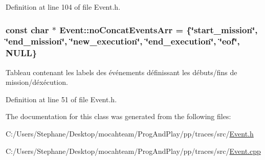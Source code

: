 Definition at line 104 of file Event.\+h.

\subsubsection[{\texorpdfstring{no\+Concat\+Events\+Arr}{noConcatEventsArr}}]{\setlength{\rightskip}{0pt plus 5cm}const char $\ast$ Event\+::no\+Concat\+Events\+Arr = \{\char`\"{}start\+\_\+mission\char`\"{}, \char`\"{}end\+\_\+mission\char`\"{}, \char`\"{}new\+\_\+execution\char`\"{}, \char`\"{}end\+\_\+execution\char`\"{}, \char`\"{}eof\char`\"{}, N\+U\+LL\}\hspace{0.3cm}{\ttfamily [static]}}\hypertarget{class_event_aaf275d46129b6cda2a84b905550349f2}{}\label{class_event_aaf275d46129b6cda2a84b905550349f2}
Tableau contenant les labels des événements définissant les débuts/fins de mission/d\textquotesingle{}éxécution. 

Definition at line 51 of file Event.\+h.



The documentation for this class was generated from the following files\+:\begin{DoxyCompactItemize}
\item 
C\+:/\+Users/\+Stephane/\+Desktop/mocahteam/\+Prog\+And\+Play/pp/traces/src/\hyperlink{_event_8h}{Event.\+h}\item 
C\+:/\+Users/\+Stephane/\+Desktop/mocahteam/\+Prog\+And\+Play/pp/traces/src/\hyperlink{_event_8cpp}{Event.\+cpp}\end{DoxyCompactItemize}
